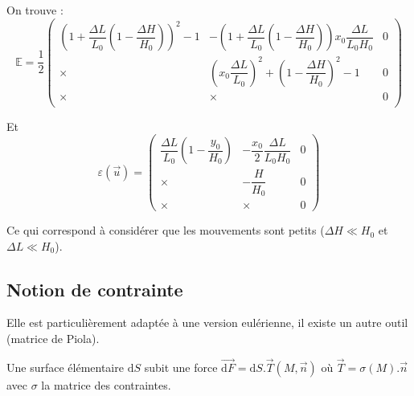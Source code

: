 \documentclass{article}
\newcommand{\deriv}{\mathrm{d}}
\begin{document}
On trouve :
\[\mathbb{E} = \dfrac{1}{2}\begin{pmatrix}
\left(1 + \dfrac{\Delta L}{L_0}\left(1-\dfrac{\Delta H}{H_0}\right)\right)^2 - 1 &
- \left(1 + \dfrac{\Delta L}{L_0}\left(1-\dfrac{\Delta H}{H_0}\right)\right) x_0 \dfrac{\Delta L}{L_0 H_0} & 0 \\
\times & \left(x_0\dfrac{\Delta L}{L_0}\right)^2 + \left(1 -\dfrac{\Delta H}{H_0}\right)^2 - 1 & 0\\
\times & \times & 0\\
\end{pmatrix}
\]

Et
\[ \varepsilon (\vec{u}) = 
\begin{pmatrix}
\dfrac{\Delta L}{L_0}\left(1-\dfrac{y_0}{H_0}\right) & -\dfrac{x_0}{2}\dfrac{\Delta L}{L_0 H_0} & 0\\
\times & -\dfrac{H}{H_0} & 0\\
\times & \times & 0
\end{pmatrix}
\]

Ce qui correspond à considérer que les mouvements sont petits ($\Delta H \ll H_0$ et $\Delta L \ll H_0$).

\subsection{Notion de contrainte}
Elle est particulièrement adaptée à une version eulérienne, il existe un autre outil (matrice de Piola).
\bigskip

Une surface élémentaire $\deriv S$ subit une force $\overrightarrow{\deriv F} = \deriv S . \vec{T}(M,\vec{n})$ où $\vec{T}=\mathbb{\sigma}(M).\vec{n}$ avec $\mathbb{\sigma}$ la matrice des contraintes.
\end{document}
